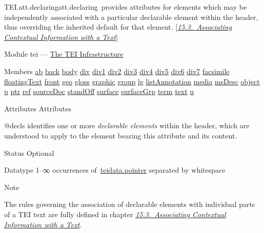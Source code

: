\begin{reflist}
\item[]\begin{specHead}{TEI.att.declaring}{att.declaring} provides attributes for elements which may be independently associated with a particular declarable element within the header, thus overriding the inherited default for that element. [\textit{\hyperref[CCAS]{15.3.\ Associating Contextual Information with a Text}}]\end{specHead} 
    \item[{Module}]
  tei — \hyperref[ST]{The TEI Infrastructure}
    \item[{Members}]
  \hyperref[TEI.ab]{ab} \hyperref[TEI.back]{back} \hyperref[TEI.body]{body} \hyperref[TEI.div]{div} \hyperref[TEI.div1]{div1} \hyperref[TEI.div2]{div2} \hyperref[TEI.div3]{div3} \hyperref[TEI.div4]{div4} \hyperref[TEI.div5]{div5} \hyperref[TEI.div6]{div6} \hyperref[TEI.div7]{div7} \hyperref[TEI.facsimile]{facsimile} \hyperref[TEI.floatingText]{floatingText} \hyperref[TEI.front]{front} \hyperref[TEI.geo]{geo} \hyperref[TEI.gloss]{gloss} \hyperref[TEI.graphic]{graphic} \hyperref[TEI.group]{group} \hyperref[TEI.lg]{lg} \hyperref[TEI.listAnnotation]{listAnnotation} \hyperref[TEI.media]{media} \hyperref[TEI.msDesc]{msDesc} \hyperref[TEI.object]{object} \hyperref[TEI.p]{p} \hyperref[TEI.ptr]{ptr} \hyperref[TEI.ref]{ref} \hyperref[TEI.sourceDoc]{sourceDoc} \hyperref[TEI.standOff]{standOff} \hyperref[TEI.surface]{surface} \hyperref[TEI.surfaceGrp]{surfaceGrp} \hyperref[TEI.term]{term} \hyperref[TEI.text]{text} \hyperref[TEI.u]{u}
    \item[{Attributes}]
  Attributes\hfil\\[-10pt]\begin{sansreflist}
    \item[@decls]
  identifies one or more \textit{declarable elements} within the header, which are understood to apply to the element bearing this attribute and its content.
\begin{reflist}
    \item[{Status}]
  Optional
    \item[{Datatype}]
  1–∞ occurrences of \hyperref[TEI.teidata.pointer]{teidata.pointer} separated by whitespace
\end{reflist}  
\end{sansreflist}  
    \item[{Note}]
  \par
The rules governing the association of declarable elements with individual parts of a TEI text are fully defined in chapter \textit{\hyperref[CCAS]{15.3.\ Associating Contextual Information with a Text}}.
\end{reflist}  

